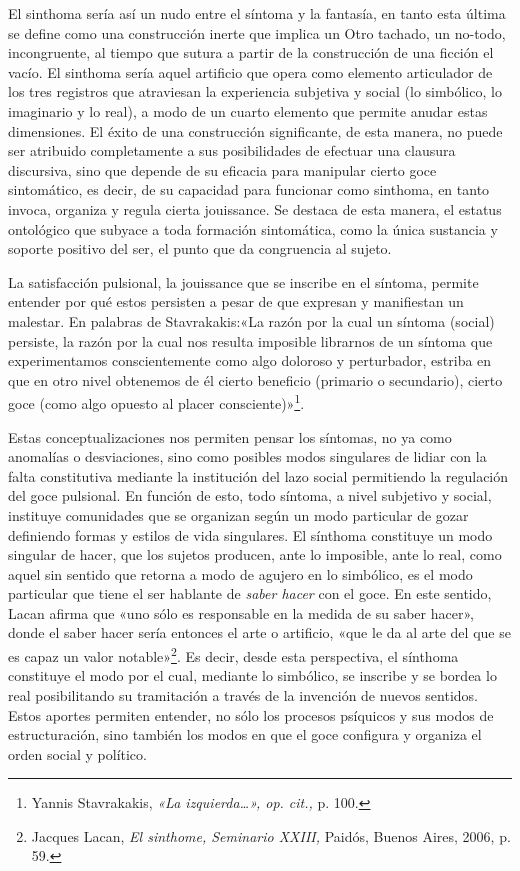 El sinthoma sería así un nudo entre el síntoma y la fantasía, en tanto esta última se define como una construcción inerte que implica un Otro tachado, un no-todo, incongruente, al tiempo que sutura a partir de la construcción de una ficción el vacío. El sinthoma sería aquel artificio que opera como elemento articulador de los tres registros que atraviesan la experiencia subjetiva y social (lo simbólico, lo imaginario y lo real), a modo de un cuarto elemento que permite anudar estas dimensiones. El éxito de una construcción significante, de esta manera, no puede ser atribuido completamente a sus posibilidades de efectuar una clausura discursiva, sino que depende de su eficacia para manipular cierto goce sintomático, es decir, de su capacidad para funcionar como sinthoma, en tanto invoca, organiza y regula cierta jouissance. Se destaca de esta manera, el estatus ontológico que subyace a toda formación sintomática, como la única sustancia y soporte positivo del ser, el punto que da congruencia al sujeto.

La satisfacción pulsional, la jouissance que se inscribe en el síntoma, permite entender por qué estos persisten a pesar de que expresan y manifiestan un malestar. En palabras de Stavrakakis:«La razón por la cual un síntoma (social) persiste, la razón por la cual nos resulta imposible librarnos de un síntoma que experimentamos conscientemente como algo doloroso y perturbador, estriba en que en otro nivel obtenemos de él cierto beneficio (primario o secundario), cierto goce (como algo opuesto al placer consciente)»\footnote{Yannis Stavrakakis, \emph{«La izquierda\ldots», op. cit.,} p. 100.}.

Estas conceptualizaciones nos permiten pensar los síntomas, no ya como anomalías o desviaciones, sino como posibles modos singulares de lidiar con la falta constitutiva mediante la institución del lazo social permitiendo la regulación del goce pulsional. En función de esto, todo síntoma, a nivel subjetivo y social, instituye comunidades que se organizan según un modo particular de gozar definiendo formas y estilos de vida singulares. El sínthoma constituye un modo singular de hacer, que los sujetos producen, ante lo imposible, ante lo real, como aquel sin sentido que retorna a modo de agujero en lo simbólico, es el modo particular que tiene el ser hablante de \emph{saber hacer} con el goce. En este sentido, Lacan afirma que «uno sólo es responsable en la medida de su saber hacer», donde el saber hacer sería entonces el arte o artificio, «que le da al arte del que se es capaz un valor notable»\footnote{Jacques Lacan, \emph{El sinthome, Seminario XXIII,} Paidós, Buenos Aires, 2006, p. 59.}. Es decir, desde esta perspectiva, el sínthoma constituye el modo por el cual, mediante lo simbólico, se inscribe y se bordea lo real posibilitando su tramitación a través de la invención de nuevos sentidos. Estos aportes permiten entender, no sólo los procesos psíquicos y sus modos de estructuración, sino también los modos en que el goce configura y organiza el orden social y político.

